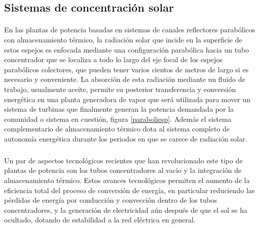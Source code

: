 \documentclass{article}
\theoremstyle{definition} \newtheorem{defi}{Definici\'on}
\theoremstyle{definition} \newtheorem{teo}{Teorema}
\theoremstyle{definition} \newtheorem{cor}{Corolario}
\begin{document}
\subsection{Sistemas de concentraci\'on solar}
\paragraph{} 
En las plantas de potencia basadas en sistemas de canales reflectores parab\'olicos con almacenamiento t\'ermico, la radiaci\'on solar que incide en la superficie de estos espejos es enfocada mediante una configuraci\'on parab\'olica hacia un tubo concentrador que se localiza a todo lo largo del eje focal de los espejos parab\'olicos colectores, que pueden tener varios cientos de metros de largo si es necesario y conveniente. La absorci\'on de esta radiaci\'on mediante un fluido de trabajo, usualmente aceite, permite su posterior transferencia y conversi\'on energ\'etica en una planta generadora de vapor que ser\'a utilizada para mover un sistema de turbinas que finalmente generan la potencia demandada por la comunidad o sistema en cuesti\'on, figura \ref{paraboliesp}. Adem\'as el sistema complementario de almacenamiento t\'ermico dota al sistema completo de autonom\'ia energ\'etica durante los periodos en que se carece de radiaci\'on solar.
\subparagraph{}
Un par de aspectos tecnol\'ogicos recientes que han revolucionado este tipo de plantas de potencia son los tubos concentradores al vac\'io y la integraci\'on de almacenamiento t\'ermico. Estos avances tecnol\'ogicos permiten el aumento de la eficiencia total del proceso de conversi\'on de energ\'ia, en particular reduciendo las p\'erdidas de energ\'ia por conducci\'on y convecci\'on dentro de los tubos concentradores, y la generaci\'on de electricidad a\'un despu\'es de que el sol se ha ocultado, dotando de estabilidad a la red el\'ectrica en general.
\end{document}
